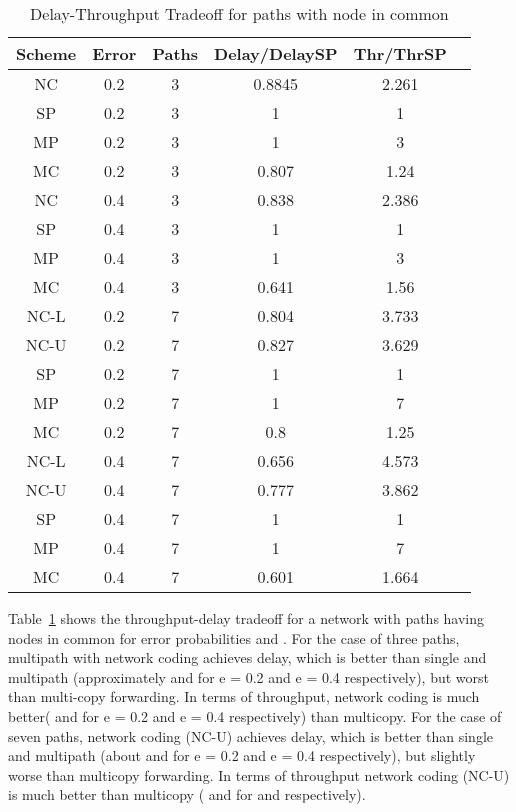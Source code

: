 \documentclass[journal, onecolumn, 12pt]{IEEEtran}
\begin{document}
\begin{table}[ht]
\centering
\begin{tabular}{c c c c c c}
\hline\hline
Scheme & Error & Paths & Delay/DelaySP & Thr/ThrSP\\ [0.5ex]
\hline
NC & 0.2 & 3 & 0.8845 & 2.261  \\
SP & 0.2 & 3 & 1 & 1  \\
MP & 0.2 & 3 & 1 & 3 \\
MC & 0.2 & 3 & 0.807 & 1.24 \\ [1ex]


NC & 0.4 & 3 & 0.838 & 2.386  \\
SP & 0.4 & 3 & 1 & 1  \\
MP & 0.4 & 3 & 1 & 3 \\
MC & 0.4 & 3 & 0.641 & 1.56 \\ [1ex]



NC-L & 0.2 & 7 & 0.804 & 3.733  \\
NC-U & 0.2 & 7 & 0.827 & 3.629  \\
SP & 0.2 & 7 & 1 &  1  \\
MP & 0.2 & 7 & 1 & 7 \\
MC & 0.2 & 7 & 0.8 & 1.25 \\ [1ex]


NC-L & 0.4 & 7 & 0.656 & 4.573  \\
NC-U & 0.4 & 7 & 0.777 & 3.862  \\
SP & 0.4 & 7 & 1 &  1  \\
MP & 0.4 & 7 & 1 & 7 \\
MC & 0.4 & 7 & 0.601 & 1.664 \\ [1ex]
\hline
\end{tabular}
\caption{Delay-Throughput Tradeoff for paths with node in common}
\label{table:trcommon}
\end{table}

Table~\ref{table:trcommon} shows the throughput-delay tradeoff for a network with paths having nodes in common for error probabilities  and .
For the case of three paths, multipath with network coding achieves delay, which is better than single and multipath (approximately  and  for e = 0.2 and e = 0.4 respectively),
but worst than multi-copy forwarding.
In terms of throughput, network coding is much better( and  for e = 0.2 and e = 0.4 respectively) than multicopy.
For the case of seven paths, network coding (NC-U) achieves delay, which is better than single and multipath (about  and  for e = 0.2 and e = 0.4 respectively), but slightly worse than multicopy forwarding.
In terms of throughput network coding (NC-U) is much better than multicopy ( and  for  and  respectively).
\end{document}
